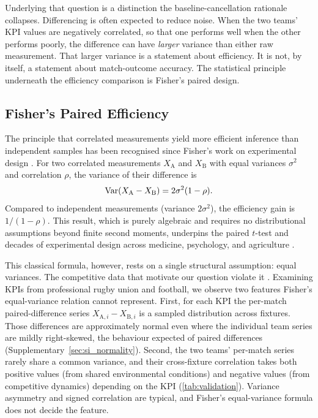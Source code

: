 Underlying that question is a distinction the baseline-cancellation rationale collapses. Differencing is often expected to reduce noise. When the two teams' KPI values are negatively correlated, so that one performs well when the other performs poorly, the difference can have \emph{larger} variance than either raw measurement. That larger variance is a statement about efficiency. It is not, by itself, a statement about match-outcome accuracy. The statistical principle underneath the efficiency comparison is Fisher's paired design.

\subsection{Fisher's Paired Efficiency}

The principle that correlated measurements yield more efficient inference than independent samples has been recognised since Fisher's work on experimental design \parencite{fisher1935}. For two correlated measurements $X_{\mathrm{A}}$ and $X_{\mathrm{B}}$ with equal variances $\sigma^{2}$ and correlation $\rho$, the variance of their difference is
\begin{equation*}
  \operatorname{Var}(X_{\mathrm{A}} - X_{\mathrm{B}}) = 2\sigma^{2}(1-\rho).
\end{equation*}
Compared to independent measurements (variance $2\sigma^{2}$), the efficiency gain is $1/(1-\rho)$. This result, which is purely algebraic and requires no distributional assumptions beyond finite second moments, underpins the paired $t$-test \parencite{student1908} and decades of experimental design across medicine, psychology, and agriculture \parencite{fisher1935}.

This classical formula, however, rests on a single structural assumption: equal variances. The competitive data that motivate our question violate it \parencite{welch1947}. Examining KPIs from professional rugby union and football, we observe two features Fisher's equal-variance relation cannot represent. First, for each KPI the per-match paired-difference series $X_{\mathrm{A},i}-X_{\mathrm{B},i}$ is a sampled distribution across fixtures. Those differences are approximately normal even where the individual team series are mildly right-skewed, the behaviour expected of paired differences (Supplementary~\cref{sec:si_normality}). Second, the two teams' per-match series rarely share a common variance, and their cross-fixture correlation takes both positive values (from shared environmental conditions) and negative values (from competitive dynamics) depending on the KPI (\cref{tab:validation}). Variance asymmetry and signed correlation are typical, and Fisher's equal-variance formula does not decide the feature.

